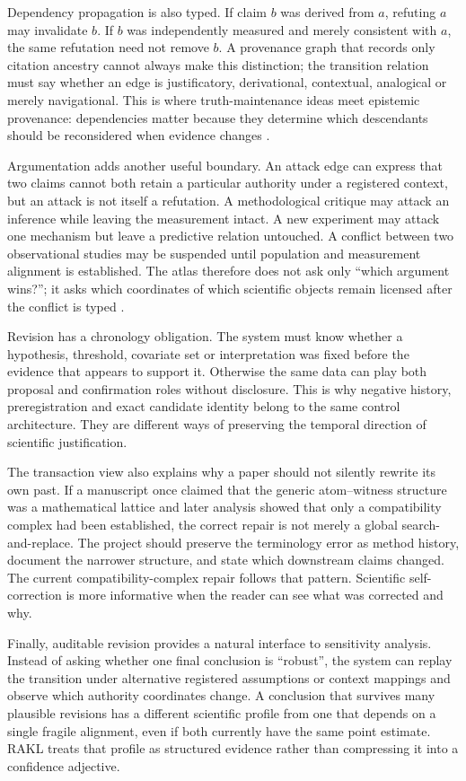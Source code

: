 Dependency propagation is also typed. If claim \(b\) was derived from \(a\), refuting \(a\) may invalidate \(b\). If \(b\) was independently measured and merely consistent with \(a\), the same refutation need not remove \(b\). A provenance graph that records only citation ancestry cannot always make this distinction; the transition relation must say whether an edge is justificatory, derivational, contextual, analogical or merely navigational. This is where truth-maintenance ideas meet epistemic provenance: dependencies matter because they determine which descendants should be reconsidered when evidence changes \cite{doyle1979,dekleer1986}.

Argumentation adds another useful boundary. An attack edge can express that two claims cannot both retain a particular authority under a registered context, but an attack is not itself a refutation. A methodological critique may attack an inference while leaving the measurement intact. A new experiment may attack one mechanism but leave a predictive relation untouched. A conflict between two observational studies may be suspended until population and measurement alignment is established. The atlas therefore does not ask only ``which argument wins?''; it asks which coordinates of which scientific objects remain licensed after the conflict is typed \cite{dung1995}.

Revision has a chronology obligation. The system must know whether a hypothesis, threshold, covariate set or interpretation was fixed before the evidence that appears to support it. Otherwise the same data can play both proposal and confirmation roles without disclosure. This is why negative history, preregistration and exact candidate identity belong to the same control architecture. They are different ways of preserving the temporal direction of scientific justification.

The transaction view also explains why a paper should not silently rewrite its own past. If a manuscript once claimed that the generic atom--witness structure was a mathematical lattice and later analysis showed that only a compatibility complex had been established, the correct repair is not merely a global search-and-replace. The project should preserve the terminology error as method history, document the narrower structure, and state which downstream claims changed. The current compatibility-complex repair follows that pattern. Scientific self-correction is more informative when the reader can see what was corrected and why.

Finally, auditable revision provides a natural interface to sensitivity analysis. Instead of asking whether one final conclusion is ``robust'', the system can replay the transition under alternative registered assumptions or context mappings and observe which authority coordinates change. A conclusion that survives many plausible revisions has a different scientific profile from one that depends on a single fragile alignment, even if both currently have the same point estimate. RAKL treats that profile as structured evidence rather than compressing it into a confidence adjective.

